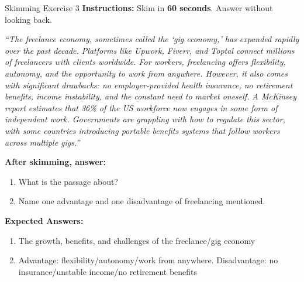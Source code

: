 \documentclass[12pt,a4paper]{article}
\begin{document}
\begin{practicebox}{Skimming Exercise 3}
\textbf{Instructions:} Skim in \textbf{60 seconds}. Answer without looking back.

\textit{``The freelance economy, sometimes called the `gig economy,' has expanded rapidly over the past decade. Platforms like Upwork, Fiverr, and Toptal connect millions of freelancers with clients worldwide. For workers, freelancing offers flexibility, autonomy, and the opportunity to work from anywhere. However, it also comes with significant drawbacks: no employer-provided health insurance, no retirement benefits, income instability, and the constant need to market oneself. A McKinsey report estimates that 36\% of the US workforce now engages in some form of independent work. Governments are grappling with how to regulate this sector, with some countries introducing portable benefits systems that follow workers across multiple gigs.''}

\textbf{After skimming, answer:}
\begin{enumerate}[noitemsep]
    \item What is the passage about?
    \item Name one advantage and one disadvantage of freelancing mentioned.
\end{enumerate}
\textbf{Expected Answers:}
\begin{enumerate}[noitemsep]
    \item The growth, benefits, and challenges of the freelance/gig economy
    \item Advantage: flexibility/autonomy/work from anywhere. Disadvantage: no insurance/unstable income/no retirement benefits
\end{enumerate}
\end{practicebox}
\end{document}
